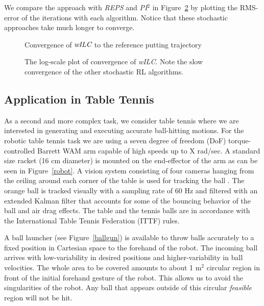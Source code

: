 We compare the approach with \emph{REPS} and \emph{PI$^{2}$} in Figure~\ref{puttingComparison} by plotting the RMS-error of the iterations with each algorithm. Notice that these stochastic approaches take much longer to converge.


\begin{figure}
\center
\scalebox{1.0}{}
\caption{Convergence of $\emph{wILC}$ to the reference putting trajectory}
\label{wILCTrajectoryPutting}
\end{figure}

\begin{figure}
\begingroup
\scalebox{0.5}{}
\endgroup
\caption{The log-scale plot of convergence of \emph{wILC}. Note the slow convergence of the other stochastic RL algorithms.}
\label{puttingComparison}
\end{figure}

\subsection{Application in Table Tennis}


As a second and more complex task, we consider table tennis where we are interested in generating and executing accurate ball-hitting motions. For the robotic table tennis task we are using a seven degree of freedom (DoF) torque-controlled Barrett WAM arm capable of high speeds up to X rad/sec. A standard size racket (16 cm diameter) is mounted on the end-effector of the arm as can be seen in Figure~\ref{robot}. A vision system consisting of four cameras hanging from the ceiling around each corner of the table is used for tracking the ball \cite{Lampert12}. The orange ball is tracked  visually with a sampling rate of 60 Hz and filtered with an extended Kalman filter that accounts for some of the bouncing behavior of the ball and air drag effects. The table and the tennis balls are in accordance with the International Table Tennis Federation (ITTF) rules.

A ball launcher (see Figure~\ref{ballgun}) is available to throw balls accurately to a fixed position in Cartesian space to the forehand of the robot. The incoming ball arrives with low-variability in desired positions and higher-variability in ball velocities. The whole area to be covered amounts to about 1 m$^2$ circular region in front of the initial forehand gesture of the robot. This allows us to avoid the singularities of the robot. Any ball that appears outside of this circular \emph{feasible} region will not be hit.

